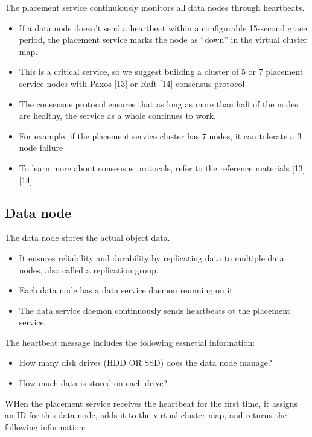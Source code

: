 \documentclass{report}
\theoremstyle{definition}
\let\oldsubsection\subsection
\renewcommand{\subsection}{\oldsubsection*}
\begin{document}
The placement service continulously monitors all data nodes through heartbeats.

\begin{itemize}
\item
If a data node doesn't send a heartbeat within a configurable 15-second grace period, the placement service marks the node as ``down'' in the virtual cluster map.

\item
This is a critical service, so we suggest building a cluster of 5 or 7 placement service nodes with Paxos [13] or Raft [14] consensus protocol
\item
The consensus protocol ensures that as long as more than half of the nodes are healthy, the service as a whole continues to work.
\item
For example, if the placement service cluster has 7 nodes, it can tolerate a 3 node failure
\item
To learn more about consensus protocols, refer to the reference materials [13] [14]
\end{itemize}

\subsection{Data node}

The data node stores the actual object data.

\begin{itemize}
\item
It ensures reliability and durability by replicating data to multiple data nodes, also called a replication group.
\item
Each data node has a data service daemon reunning on it
\item
The data service daemon continuously sends heartbeats ot the placement service.
\end{itemize}

The heartbeat message includes the following essnetial information:

\begin{itemize}
\item
How many disk drives (HDD OR SSD) does the data node manage?
\item
How much data is stored on each drive?
\end{itemize}

WHen the placement service receives the heartbeat for the first time, it assigns an ID for this data node, adds it to the virtual cluster map, and returns the following information:
\end{document}
